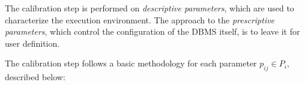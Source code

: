 \documentclass[jidm,a4paper]{jidm} %
\begin{document}
The calibration step is performed on  \textit{descriptive parameters}, which are used to characterize the execution environment. The approach to the \textit{prescriptive parameters}, which control the configuration of the DBMS itself, is to leave it for user definition. 



% 
% 
% 
% 
% 
% 
% 
% 
% 

The calibration step follows a basic methodology for each parameter $p_{ij} \in P_{i}$, described below:
\end{document}
